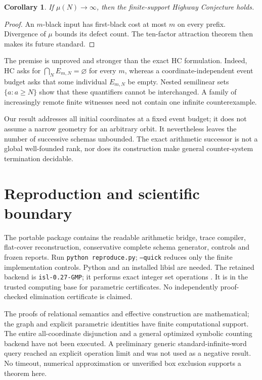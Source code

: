 \documentclass[11pt]{article}
\newtheorem{corollary}[theorem]{Corollary}
\theoremstyle{remark}\newtheorem{remark}[theorem]{Remark}
\begin{document}
\begin{corollary}
If $\mu(N)\to\infty$, then the finite-support Highway Conjecture holds.
\end{corollary}
\begin{proof}
An $m$-black input has first-black cost at most $m$ on every prefix. Divergence
of $\mu$ bounds its defect count. The ten-factor attraction theorem then makes
its future standard.
\end{proof}

The premise is unproved and stronger than the exact HC formulation. Indeed,
HC asks for $\bigcap_NE_{m,N}=\varnothing$ for every $m$, whereas a
coordinate-independent event budget asks that some individual $E_{m,N}$ be
empty. Nested semilinear sets $\{a:a\ge N\}$ show that these quantifiers cannot
be interchanged. A family of increasingly remote finite witnesses need not
contain one infinite counterexample.

Our result addresses all initial coordinates at a fixed event budget; it does
not assume a narrow geometry for an arbitrary orbit. It nevertheless leaves
the number of successive schemas unbounded. The exact arithmetic successor is
not a global well-founded rank, nor does its construction make general
counter-system termination decidable.

\section{Reproduction and scientific boundary}
The portable package contains the readable arithmetic bridge, trace compiler,
flat-cover reconstruction, conservative complete schema generator, controls and
frozen reports. Run \texttt{python reproduce.py}; \texttt{--quick} reduces only
the finite implementation controls. Python and an installed libisl are needed.
The retained backend is \texttt{isl-0.27-GMP}; it performs exact integer set
operations \cite{isl}. It is in the trusted computing base for parametric
certificates. No independently proof-checked elimination certificate is claimed.

The proofs of relational semantics and effective construction are mathematical;
the graph and explicit parametric identities have finite computational support.
The entire all-coordinate disjunction and a general optimized symbolic counting
backend have not been executed. A preliminary generic standard-infinite-word
query reached an explicit operation limit and was not used as a negative
result. No timeout, numerical approximation or unverified box exclusion supports
a theorem here.
\end{document}
